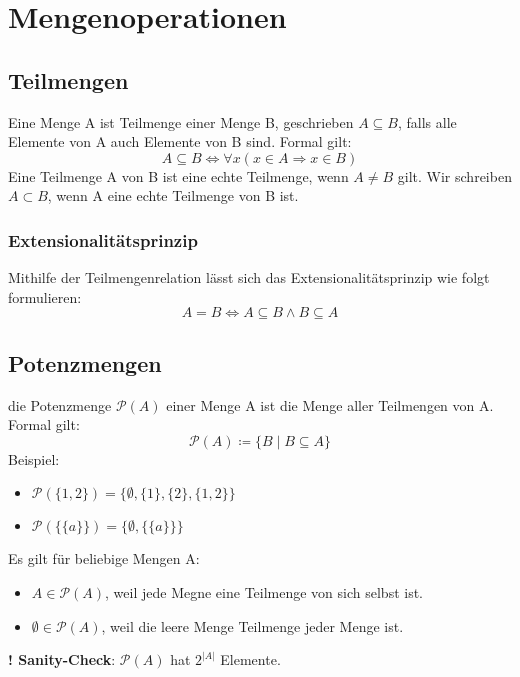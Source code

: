 \section{Mengenoperationen}
\subsection{Teilmengen}
Eine Menge A ist Teilmenge einer Menge B, geschrieben $A \subseteq B$, falls alle Elemente von A auch Elemente von B sind.
Formal gilt:
\begin{equation}
    A \subseteq B \Leftrightarrow \forall{x}(x \in A \Rightarrow x \in B)
\end{equation}
Eine Teilmenge A  von B ist eine echte Teilmenge, wenn $A \neq B$ gilt. Wir schreiben $A \subset B$,
wenn A eine echte Teilmenge von B ist.

\subsubsection{Extensionalitätsprinzip}
Mithilfe der Teilmengenrelation lässt sich das Extensionalitätsprinzip wie folgt formulieren:
\begin{equation}
    A = B \Leftrightarrow A \subseteq B \wedge B \subseteq A
\end{equation}

\subsection{Potenzmengen}
die Potenzmenge $\mathcal{P}(A)$ einer Menge A ist die Menge aller Teilmengen von A. Formal gilt:
\begin{equation}
\mathcal{P}(A) \coloneqq \{B \mid B \subseteq A\}
\end{equation}
Beispiel: 
\begin{itemize}
    \item $\mathcal{P}(\{1,2\}) = \{\emptyset, \{1\}, \{2\}, \{1,2\}\}$
    \item $\mathcal{P}(\{\{a\}\}) = \{\emptyset, \{\{a\}\}\}$
\end{itemize}

Es gilt für beliebige Mengen A:
\begin{itemize}
    \item $A \in \mathcal{P}(A)$, weil jede Megne eine Teilmenge von sich selbst ist.
    \item $\emptyset \in \mathcal{P}(A)$, weil die leere Menge Teilmenge jeder Menge ist.
\end{itemize}
{\bf! Sanity-Check}: $\mathcal{P}(A)$ hat $2^{|A|}$ Elemente.
